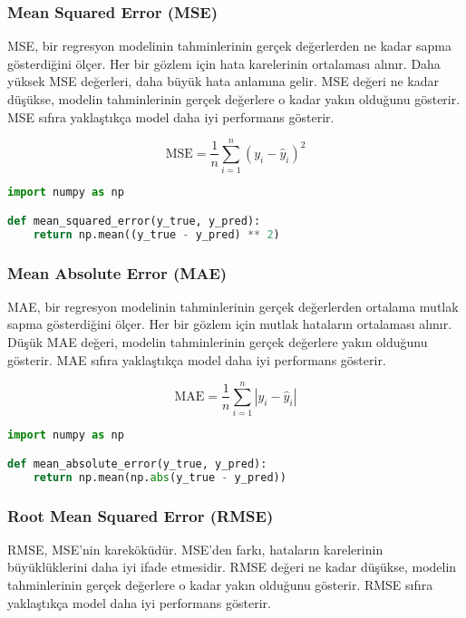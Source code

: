 \newpage

\subsubsection{Mean Squared Error (MSE)}

MSE, bir regresyon modelinin tahminlerinin gerçek değerlerden ne kadar sapma gösterdiğini ölçer. Her bir gözlem için hata karelerinin ortalaması alınır. Daha yüksek MSE değerleri, daha büyük hata anlamına gelir. MSE değeri ne kadar düşükse, modelin tahminlerinin gerçek değerlere o kadar yakın olduğunu gösterir. MSE sıfıra yaklaştıkça model daha iyi performans gösterir.

\[\text{MSE} = \frac{1}{n} \sum_{i=1}^{n} (y_i - \hat{y}_i)^2\]

\begin{lstlisting}[language=Python]
import numpy as np

def mean_squared_error(y_true, y_pred):
    return np.mean((y_true - y_pred) ** 2)
\end{lstlisting}

\newpage

\subsubsection{Mean Absolute Error (MAE)}

MAE, bir regresyon modelinin tahminlerinin gerçek değerlerden ortalama mutlak sapma gösterdiğini ölçer. Her bir gözlem için mutlak hataların ortalaması alınır. Düşük MAE değeri, modelin tahminlerinin gerçek değerlere yakın olduğunu gösterir. MAE sıfıra yaklaştıkça model daha iyi performans gösterir.

\[\text{MAE} = \frac{1}{n} \sum_{i=1}^{n} |y_i - \hat{y}_i|\]

\begin{lstlisting}[language=Python]
import numpy as np

def mean_absolute_error(y_true, y_pred):
    return np.mean(np.abs(y_true - y_pred))
\end{lstlisting}

\newpage

\subsubsection{Root Mean Squared Error (RMSE)}

RMSE, MSE'nin kareköküdür. MSE'den farkı, hataların karelerinin büyüklüklerini daha iyi ifade etmesidir. RMSE değeri ne kadar düşükse, modelin tahminlerinin gerçek değerlere o kadar yakın olduğunu gösterir. RMSE sıfıra yaklaştıkça model daha iyi performans gösterir.

